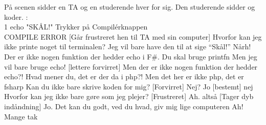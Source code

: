\documentclass{article}
\begin{document}
\newpage%
\begin{sketch}
\scene{} På scenen sidder en TA og en studerende hver for sig. Den studerende sidder og koder.
: \\
1 echo "SKÅL!"
 Trykker på Compilérknappen
 \\ COMPILE ERROR
[Går frustreret hen til TA med sin computer] Hvorfor kan jeg ikke printe noget til terminalen? Jeg vil bare have den til at sige “Skål!”
 Nårh! Der er ikke nogen funktion der hedder echo i F\#. Du skal bruge printfn
 Men jeg vil bare bruge echo!
[lettere forvirret] Men der er ikke nogen funktion der hedder echo?!
 Hvad mener du, det er der da i php?!
 Men det her er ikke php, det er fsharp
 Kan du ikke bare skrive koden for mig?
[Forvirret] Nej?
 Jo
[bestemt] nej
 Hvorfor kan jeg ikke bare gøre som jeg plejer?
[Frustreret] Ah. altså
[Tager dyb indåndning]
 Jo. Det kan du godt, ved du hvad, giv mig lige computeren
 Ah! Mange tak


\end{sketch}
\end{document}
